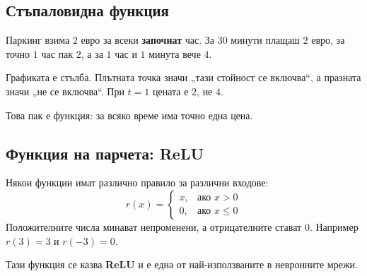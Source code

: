 \documentclass[11pt,a4paper]{article}
\begin{document}
\subsection{Стъпаловидна функция}
\begin{minipage}[c]{0.4\textwidth}
\end{minipage}\hfill
\begin{minipage}[c]{0.56\textwidth}
Паркинг взима $2$ евро за всеки \textbf{започнат} час. За $30$ минути плащаш $2$ евро, за точно $1$ час пак $2$, а за $1$ час и $1$ минута вече $4$.

Графиката е стълба. Плътната точка значи „тази стойност се включва“, а празната значи „не се включва“. При $t=1$ цената е $2$, не $4$.

Това пак е функция: за всяко време има точно една цена.
\end{minipage}

\subsection{Функция на парчета: ReLU}
\begin{minipage}[c]{0.4\textwidth}
\end{minipage}\hfill
\begin{minipage}[c]{0.56\textwidth}
Някои функции имат различно правило за различни входове:
\[ r(x)=\begin{cases} x, & \text{ако } x>0\\ 0, & \text{ако } x\le 0\end{cases} \]
Положителните числа минават непроменени, а отрицателните стават $0$. Например $r(3)=3$ и $r(-3)=0$.

Тази функция се казва \textbf{ReLU} и е една от най-използваните в невронните мрежи.
\end{minipage}
\end{document}
